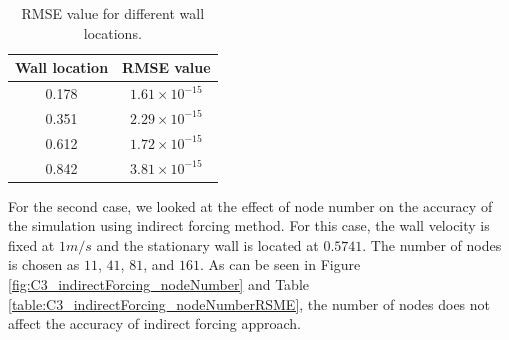 \begin{table}[H]
\centering
\begin{tabular}{c | c}
	 Wall location & RMSE value \\ \hline \hline
	 0.178 & $1.61 \times 10^{-15}$ \\ \hline
	 0.351 & $2.29 \times 10^{-15}$ \\ \hline
	 0.612 & $1.72 \times 10^{-15}$ \\ \hline
	 0.842 & $3.81 \times 10^{-15}$
\end{tabular}
\caption{RMSE value for different wall locations.}
\label{table:C3_indirectForcing_wallLocationRSME}
\end{table}

For the second case, we looked at the effect of node number on the accuracy of the simulation using indirect forcing method. For this case, the wall velocity is fixed at $1 m/s$ and the stationary wall is located at $0.5741$. The number of nodes is chosen as $11$, $41$, $81$, and $161$. As can be seen in Figure \ref{fig:C3_indirectForcing_nodeNumber} and Table \ref{table:C3_indirectForcing_nodeNumberRSME}, the number of nodes does not affect the accuracy of indirect forcing approach.

